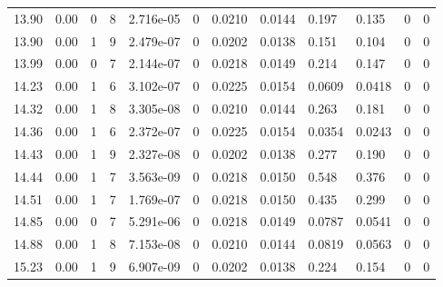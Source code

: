 \documentclass[preview]{standalone}
\begin{document}
{{{{\begin{tabular}{L{1.2cm}C{1.2cm} C{0.3cm}C{0.5cm} C{1.4cm}C{1.4cm} C{1.4cm}C{1.4cm} C{1.6cm}C{1.6cm} C{1.6cm}C{1.6cm}}
  13.90  &  0.00  & 0     &  8 &  2.716e-05  & 0  &  0.0210&   0.0144& 0.197 & 0.135   &  0 & 0  \\ 
  13.90  &  0.00  & 1     &  9 &  2.479e-07  & 0  &  0.0202&   0.0138& 0.151 & 0.104   &  0 & 0  \\ 
  13.99  &  0.00  & 0     &  7 &  2.144e-07  & 0  &  0.0218&   0.0149& 0.214 & 0.147   &  0 & 0  \\ 
  14.23  &  0.00  & 1     &  6 &  3.102e-07  & 0  &  0.0225&   0.0154& 0.0609 & 0.0418   &  0 & 0  \\ 
  14.32  &  0.00  & 1     &  8 &  3.305e-08  & 0  &  0.0210&   0.0144& 0.263 & 0.181   &  0 & 0  \\ 
  14.36  &  0.00  & 1     &  6 &  2.372e-07  & 0  &  0.0225&   0.0154& 0.0354 & 0.0243   &  0 & 0  \\ 
  14.43  &  0.00  & 1     &  9 &  2.327e-08  & 0  &  0.0202&   0.0138& 0.277 & 0.190   &  0 & 0  \\ 
  14.44  &  0.00  & 1     &  7 &  3.563e-09  & 0  &  0.0218&   0.0150& 0.548 & 0.376   &  0 & 0  \\ 
  14.51  &  0.00  & 1     &  7 &  1.769e-07  & 0  &  0.0218&   0.0150& 0.435 & 0.299   &  0 & 0  \\ 
  14.85  &  0.00  & 0     &  7 &  5.291e-06  & 0  &  0.0218&   0.0149& 0.0787 & 0.0541   &  0 & 0  \\ 
  14.88  &  0.00  & 1     &  8 &  7.153e-08  & 0  &  0.0210&   0.0144& 0.0819 & 0.0563   &  0 & 0  \\ 
  15.23  &  0.00  & 1     &  9 &  6.907e-09  & 0  &  0.0202&   0.0138& 0.224 & 0.154   &  0 & 0  \\ 
\hline 
\end{tabular} 

}}}}
\end{document}
